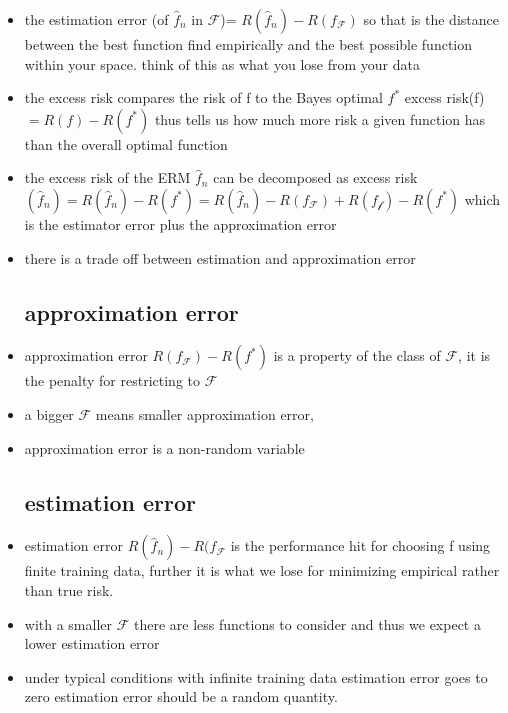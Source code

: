\documentclass{article}
\begin{document}
\begin{itemize}
\item the estimation error (of $\hat{f}_{n}$ in $\mathcal{F}$)= $R(\hat{f}_{n})-R(f_{\mathcal{F}})$ so that is the distance between the best function find empirically and the best possible function within your space. think of this as what you lose from your data 
\item the excess risk compares the risk of f to the Bayes optimal $f^{*}$ excess risk(f)$=R(f)-R(f^{*})$ thus tells us how much more risk a given function has than the overall optimal function 
\item the excess risk of the ERM $\hat{f}_{n}$ can be decomposed as excess risk$(\hat{f}_{n})=R(\hat{f}_{n})-R(f^{*})=R(\hat{f}_{n})-R(f_{\mathcal{F}})+R(f_{\mathcal{f}})-R(f^{*})$ which is the estimator error plus the approximation error 
\item there is a trade off between estimation and approximation error 
\subsection{approximation error}
\item approximation error $R(f_{\mathcal{F}})-R(f^{*})$ is a property of the class of $\mathcal{F}$, it is the penalty for restricting to $\mathcal{F}$ 
\item a bigger $\mathcal{F}$ means smaller approximation error, 
\item approximation error is a non-random variable
\subsection{estimation error}
\item estimation error $R(\hat{f}_{n})-R(f_{\mathcal{F}}$ is the performance hit for choosing f using finite training data, further it is what we lose for minimizing empirical rather than true risk. 
\item with a smaller $\mathcal{F}$ there are less functions to consider and thus we expect a lower estimation error 
\item under typical conditions with infinite training data estimation error goes to zero
\itme estimation error should be a random quantity. 

\end{itemize}
\end{document}
